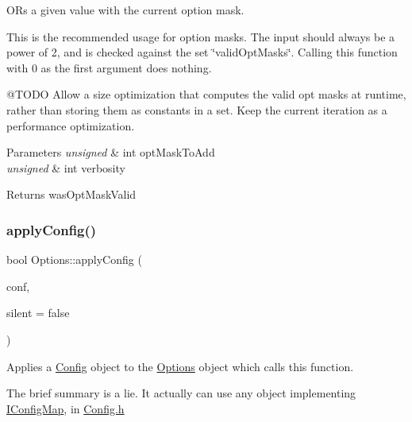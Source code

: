 OR\textquotesingle{}s a given value with the current option mask. 

This is the recommended usage for option masks. The input should always be a power of 2, and is checked against the set \char`\"{}valid\+Opt\+Masks\char`\"{}. Calling this function with 0 as the first argument does nothing.

@\+T\+O\+DO Allow a size optimization that computes the valid opt masks at runtime, rather than storing them as constants in a set. Keep the current iteration as a performance optimization.


\begin{DoxyParams}{Parameters}
{\em unsigned} & int opt\+Mask\+To\+Add \\
\hline
{\em unsigned} & int verbosity\\
\hline
\end{DoxyParams}
\begin{DoxyReturn}{Returns}
was\+Opt\+Mask\+Valid 
\end{DoxyReturn}
\mbox{\label{classOptions_aefe43c4696f98d4933fd227c76bb6e28}} 
\subsubsection{\texorpdfstring{applyConfig()}{applyConfig()}\hspace{0.1cm}{\footnotesize\ttfamily [1/2]}}
{\footnotesize\ttfamily bool Options\+::apply\+Config (\begin{DoxyParamCaption}\item[{\mbox{\hyperlink{classIConfigMap}{I\+Config\+Map}} \&}]{conf,  }\item[{bool}]{silent = {\ttfamily false} }\end{DoxyParamCaption})}



Applies a \mbox{\hyperlink{classConfig}{Config}} object to the \mbox{\hyperlink{classOptions}{Options}} object which calls this function. 

The brief summary is a lie. It actually can use any object implementing \mbox{\hyperlink{classIConfigMap}{I\+Config\+Map}}, in \mbox{\hyperlink{Config_8h}{Config.\+h}}

